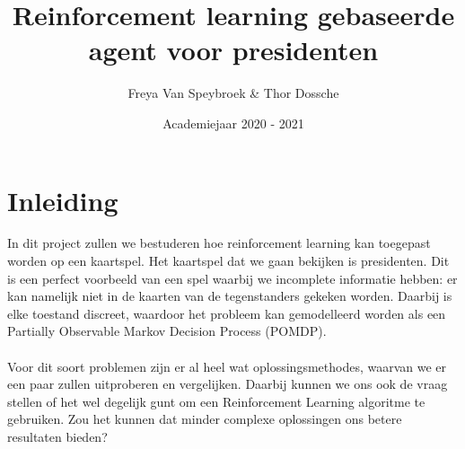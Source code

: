 \documentclass[11pt]{article}
\begin{document}
\begin{titlepage}
\title{Reinforcement learning gebaseerde agent voor presidenten}
\author{Freya Van Speybroek \& Thor Dossche}
\date{Academiejaar 2020 - 2021}
\maketitle
\thispagestyle{empty}
\end{titlepage}


\section{Inleiding}
In dit project zullen we bestuderen hoe reinforcement learning kan toegepast worden op een kaartspel. Het kaartspel dat we gaan bekijken is presidenten. Dit is een perfect voorbeeld van een spel waarbij we incomplete informatie hebben: er kan namelijk niet in de kaarten van de tegenstanders gekeken worden. Daarbij is elke toestand discreet, waardoor het probleem kan gemodelleerd worden als een Partially Observable Markov Decision Process (POMDP). \\\\ Voor dit soort problemen zijn er al heel wat oplossingsmethodes, waarvan we er een paar zullen uitproberen en vergelijken. Daarbij kunnen we ons ook de vraag stellen of het wel degelijk gunt om een Reinforcement Learning algoritme te gebruiken. Zou het kunnen dat minder complexe oplossingen ons betere resultaten bieden?
\end{document}

